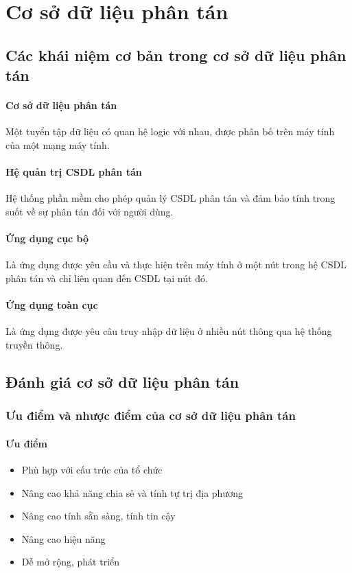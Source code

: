 \documentclass[12pt,a4paper]{report}
\begin{document}
\chapter{Cơ sở dữ liệu phân tán}
\section{Các khái niệm cơ bản trong cơ sở dữ liệu phân tán}
\subsubsection{Cơ sở dữ liệu phân tán}
Một tuyển tập dữ liệu có quan hệ logic với nhau, được phân bố trên máy tính của một mạng máy tính. 
\subsubsection{Hệ quản trị CSDL phân tán} Hệ thống phần mềm cho phép quản lý CSDL phân tán và đảm bảo tính trong suốt về sự phân tán đối với người dùng.
\subsubsection{Ứng dụng cục bộ} Là ứng dụng được yêu cầu và thực hiện trên máy tính ở một nút trong hệ CSDL phân tán và chỉ liên quan đến CSDL tại nút đó.
\subsubsection{Ứng dụng toàn cục} Là ứng dụng được yêu câu truy nhập dữ liệu ở nhiều nút thông qua hệ thống truyền thông.
\section{Đánh giá cơ sở dữ liệu phân tán}
\subsection{Ưu điểm và nhược điểm của cơ sở dữ liệu phân tán}
\subsubsection{Ưu điểm}
\begin{itemize}
	\item Phù hợp với cấu trúc của tổ chức
	\item Nâng cao khả năng chia sẻ và tính tự trị địa phương
	\item Nâng cao tính sẵn sàng, tính tin cậy
	\item Nâng cao hiệu năng
	\item Dễ mở rộng, phát triển
\end{itemize}
\end{document}
